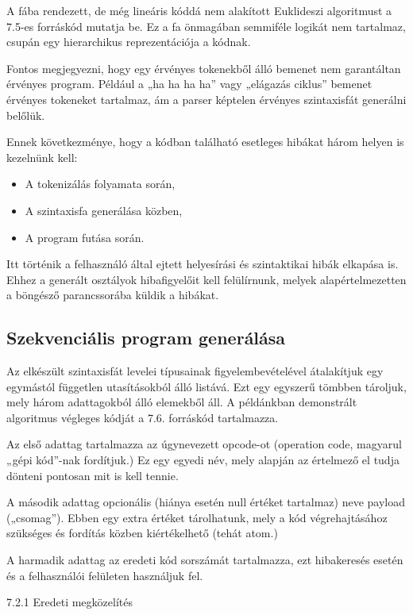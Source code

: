 A fába rendezett, de még lineáris kóddá nem alakított Euklideszi algoritmust a 7.5-es forráskód mutatja be. Ez a fa önmagában semmiféle logikát nem tartalmaz, csupán egy hierarchikus reprezentációja a kódnak.

Fontos megjegyezni, hogy egy érvényes tokenekből álló bemenet nem garantáltan érvényes program. Például a „ha ha ha ha” vagy „elágazás ciklus” bemenet érvényes tokeneket tartalmaz, ám a parser képtelen érvényes szintaxisfát generálni belőlük.

Ennek következménye, hogy a kódban található esetleges hibákat három helyen is kezelnünk kell:

\begin{itemize}
    \item A tokenizálás folyamata során,
    \item A szintaxisfa generálása közben,
    \item A program futása során.
\end{itemize}

Itt történik a felhasználó által ejtett helyesírási és szintaktikai hibák elkapása is. Ehhez a generált osztályok hibafigyelőit kell felülírnunk, melyek alapértelmezetten a böngésző parancssorába küldik a hibákat.

\subsection{Szekvenciális program generálása}

Az elkészült szintaxisfát levelei típusainak figyelembevételével átalakítjuk egy egymástól független utasításokból álló listává. Ezt egy egyszerű tömbben tároljuk, mely három adattagokból álló elemekből áll. A példánkban demonstrált algoritmus végleges kódját a 7.6. forráskód tartalmazza.

Az első adattag tartalmazza az úgynevezett opcode-ot (operation code, magyarul „gépi kód”-nak fordítjuk.) Ez egy egyedi név, mely alapján az értelmező el tudja dönteni pontosan mit is kell tennie.

A második adattag opcionális (hiánya esetén null értéket tartalmaz) neve payload („csomag”). Ebben egy extra értéket tárolhatunk, mely a kód végrehajtásához szükséges és fordítás közben kiértékelhető (tehát atom.)

A harmadik adattag az eredeti kód sorszámát tartalmazza, ezt hibakeresés esetén és a felhasználói felületen használjuk fel.

7.2.1 Eredeti megközelítés

